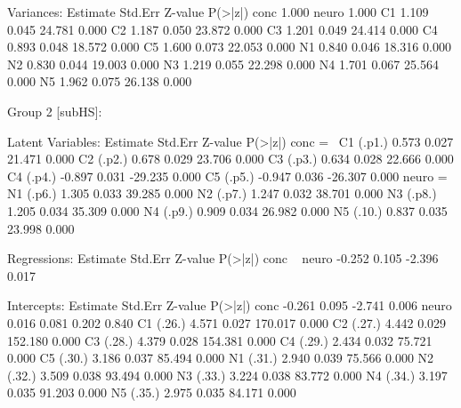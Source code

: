 \begin{Schunk}
\begin{Soutput}
Variances:
                   Estimate  Std.Err  Z-value  P(>|z|)
    conc              1.000                           
    neuro             1.000                           
    C1                1.109    0.045   24.781    0.000
    C2                1.187    0.050   23.872    0.000
    C3                1.201    0.049   24.414    0.000
    C4                0.893    0.048   18.572    0.000
    C5                1.600    0.073   22.053    0.000
    N1                0.840    0.046   18.316    0.000
    N2                0.830    0.044   19.003    0.000
    N3                1.219    0.055   22.298    0.000
    N4                1.701    0.067   25.564    0.000
    N5                1.962    0.075   26.138    0.000


Group 2 [subHS]:

Latent Variables:
                   Estimate  Std.Err  Z-value  P(>|z|)
  conc =~                                             
    C1      (.p1.)    0.573    0.027   21.471    0.000
    C2      (.p2.)    0.678    0.029   23.706    0.000
    C3      (.p3.)    0.634    0.028   22.666    0.000
    C4      (.p4.)   -0.897    0.031  -29.235    0.000
    C5      (.p5.)   -0.947    0.036  -26.307    0.000
  neuro =~                                            
    N1      (.p6.)    1.305    0.033   39.285    0.000
    N2      (.p7.)    1.247    0.032   38.701    0.000
    N3      (.p8.)    1.205    0.034   35.309    0.000
    N4      (.p9.)    0.909    0.034   26.982    0.000
    N5      (.10.)    0.837    0.035   23.998    0.000

Regressions:
                   Estimate  Std.Err  Z-value  P(>|z|)
  conc ~                                              
    neuro            -0.252    0.105   -2.396    0.017

Intercepts:
                   Estimate  Std.Err  Z-value  P(>|z|)
    conc             -0.261    0.095   -2.741    0.006
    neuro             0.016    0.081    0.202    0.840
    C1      (.26.)    4.571    0.027  170.017    0.000
    C2      (.27.)    4.442    0.029  152.180    0.000
    C3      (.28.)    4.379    0.028  154.381    0.000
    C4      (.29.)    2.434    0.032   75.721    0.000
    C5      (.30.)    3.186    0.037   85.494    0.000
    N1      (.31.)    2.940    0.039   75.566    0.000
    N2      (.32.)    3.509    0.038   93.494    0.000
    N3      (.33.)    3.224    0.038   83.772    0.000
    N4      (.34.)    3.197    0.035   91.203    0.000
    N5      (.35.)    2.975    0.035   84.171    0.000


\end{Soutput}
\end{Schunk}
